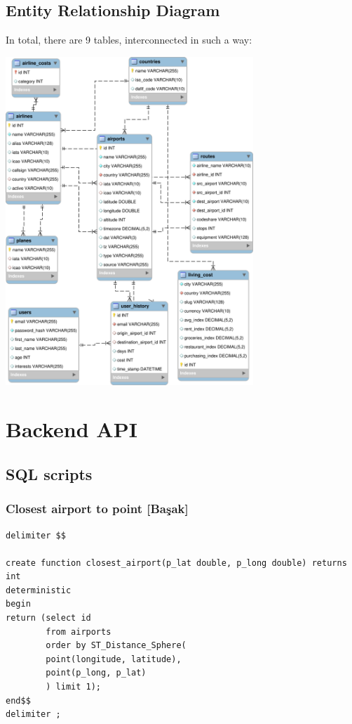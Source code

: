 \documentclass[12pt]{article}
\begin{document}
\subsection{Entity Relationship Diagram}
\label{sec:orgcb57fcb}
In total, there are 9 tables, interconnected in such a way:
 \begin{center}
\includegraphics[width=0.7\textwidth]{./images/erdiagram.png}
\end{center}

\section{Backend API}
\label{sec:orgfe751fa}
\subsection{SQL scripts}
\label{sec:org2986b4f}
\subsubsection{Closest airport to point [Başak]}
\label{sec:org274b29b}
\begin{verbatim}
delimiter $$

create function closest_airport(p_lat double, p_long double) returns int
deterministic
begin
return (select id
		from airports
		order by ST_Distance_Sphere(
		point(longitude, latitude), 
		point(p_long, p_lat)
		) limit 1);
end$$
delimiter ;  
\end{verbatim}
\end{document}
